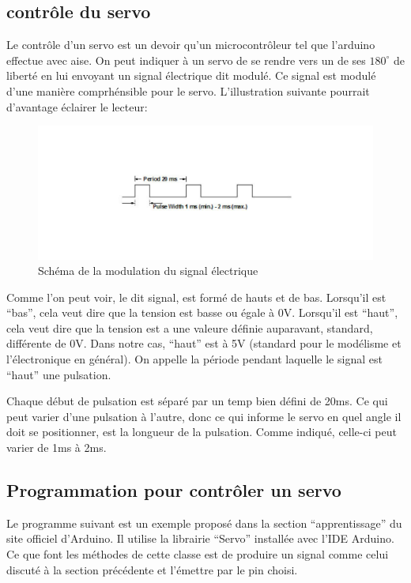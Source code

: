 \documentclass[a4paper,12pt]{article}
\begin{document}
{\subsection{contr\^ole du servo}
Le contr\^ole d'un servo est un devoir qu'un microcontr\^oleur tel que
l'arduino effectue avec aise. On peut indiquer \`a un servo de se rendre vers
un de ses $180^{\circ}$ de libert\'e en lui envoyant un signal \'electrique dit
modul\'e. Ce signal est modul\'e d'une mani\`ere comprh\'ensible pour le
servo. L'illustration suivante
pourrait d'avantage \'eclairer le lecteur:

\begin{figure}[h]
\centering
\includegraphics[width=1.0\textwidth]{figures/ServoPwm}
    \caption{\label{ServoPwm}Sch\'ema de la modulation du signal
      \'electrique \protect
      \cite{WikiServo}
    }
\end{figure}

Comme l'on peut voir, le dit signal, est form\'e de hauts et de
bas. Lorsqu'il est ``bas'', cela veut dire que la tension est basse ou \'egale
\`a 0V. Lorsqu'il est
``haut'', cela veut dire que la tension est a une valeure d\'efinie auparavant,
standard, diff\'erente de 0V. Dans notre cas, ``haut'' est \`a 5V (standard
pour le mod\'elisme et l'\'electronique en g\'en\'eral). On appelle la
p\'eriode pendant laquelle le signal est ``haut'' une pulsation.

Chaque d\'ebut de pulsation est s\'epar\'e par un temp bien d\'efini de
20ms. Ce qui peut varier d'une pulsation \`a l'autre, donc ce qui informe le
servo en quel angle il doit se positionner, est la longueur de la
pulsation. Comme indiqu\'e, celle-ci peut varier de 1ms \`a 2ms.

\subsection{Programmation pour contr\^oler un servo}
Le programme suivant est un exemple propos\'e dans la section
``apprentissage'' du site officiel d'Arduino. Il utilise la librairie
``Servo'' install\'ee avec l'IDE Arduino. Ce que font les m\'ethodes de cette
classe est de produire un signal comme celui discut\'e \`a la section
pr\'ec\'edente et l'\'emettre par le pin choisi.

}
\end{document}
